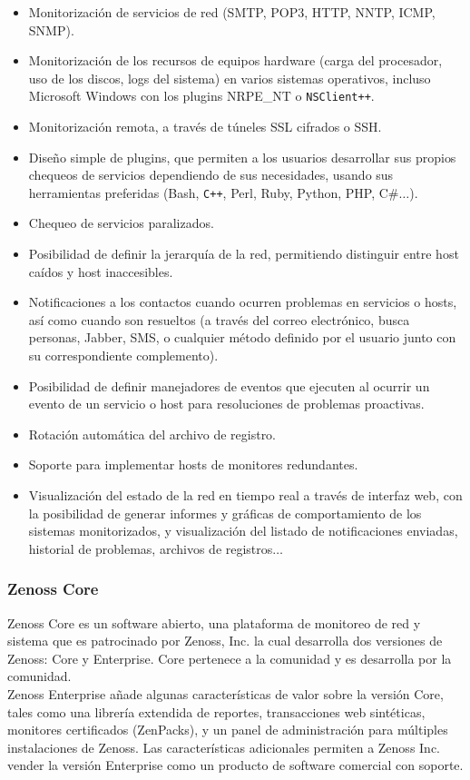 \begin{itemize}
\item Monitorización de servicios de red (SMTP, POP3, HTTP, NNTP, ICMP, SNMP).
\item Monitorización de los recursos de equipos hardware (carga del procesador, uso de los discos, logs del sistema) en varios sistemas operativos, incluso Microsoft Windows con los plugins NRPE\_NT o \texttt{NSClient++}.
\item Monitorización remota, a través de túneles SSL cifrados o SSH.
\item Diseño simple de plugins, que permiten a los usuarios desarrollar sus propios chequeos de servicios dependiendo de sus necesidades, usando sus herramientas preferidas (Bash, \texttt{C++}, Perl, Ruby, Python, PHP, C\#$\ldots$).
\item Chequeo de servicios paralizados.
\item Posibilidad de definir la jerarquía de la red, permitiendo distinguir entre host caídos y host inaccesibles.
\item Notificaciones a los contactos cuando ocurren problemas en servicios o hosts, así como cuando son resueltos (a través del correo electrónico, busca personas, Jabber, SMS, o cualquier método definido por el usuario junto con su correspondiente complemento).
\item Posibilidad de definir manejadores de eventos que ejecuten al ocurrir un evento de un servicio o host para resoluciones de problemas proactivas.
\item Rotación automática del archivo de registro.
\item Soporte para implementar hosts de monitores redundantes.
\item Visualización del estado de la red en tiempo real a través de interfaz web, con la posibilidad de generar informes y gráficas de comportamiento de los sistemas monitorizados, y visualización del listado de notificaciones enviadas, historial de problemas, archivos de registros$\ldots$
\end{itemize}

\pagebreak

\subsubsection{Zenoss Core}

Zenoss Core es un software abierto, una plataforma de monitoreo de red
y sistema que es patrocinado por Zenoss, Inc. la cual desarrolla dos
versiones de Zenoss: Core y Enterprise. Core pertenece a la comunidad
y es desarrolla por la comunidad. \\
Zenoss Enterprise añade algunas características de valor sobre la
versión Core, tales como una librería extendida de reportes,
transacciones web sintéticas, monitores certificados (ZenPacks), y
un panel de administración para múltiples instalaciones de
Zenoss. Las características adicionales permiten a Zenoss
Inc. vender la versión Enterprise como un producto de software
comercial con soporte.

